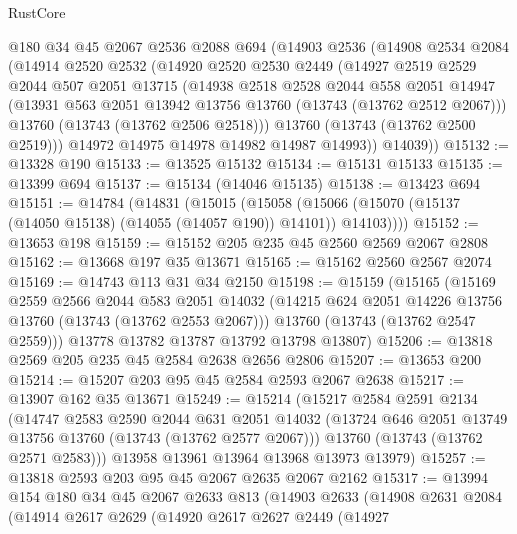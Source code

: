 \begin{lexlean}{RustCore}
\begin{coremodule}
    @180
    @34
    @45
    @2067
    @2536
    @2088
    @694
    (@14903
      @2536
      (@14908
        @2534
        @2084
        (@14914
          @2520
          @2532
          (@14920
            @2520
            @2530
            @2449
            (@14927
              @2519
              @2529
              @2044
              @507
              @2051
              @13715
              (@14938
                @2518
                @2528
                @2044
                @558
                @2051
                @14947
                (@13931 @563 @2051 @13942 @13756 @13760 (@13743 (@13762 @2512 @2067)))
                @13760
                (@13743 (@13762 @2506 @2518)))
              @13760
              (@13743 (@13762 @2500 @2519)))
            @14972
            @14975
            @14978
            @14982
            @14987
            @14993))
        @14039))
@15132 := @13328 @190
@15133 := @13525 @15132
@15134 := @15131 @15133
@15135 := @13399 @694
@15137 := @15134 (@14046 @15135)
@15138 := @13423 @694
@15151 := @14784
    (@14831
      (@15015
        (@15058 (@15066 (@15070 (@15137 (@14050 @15138) (@14055 (@14057 @190)) @14101)) @14103))))
@15152 := @13653 @198
@15159 := @15152 @205 @235 @45 @2560 @2569 @2067 @2808
@15162 := @13668 @197 @35 @13671
@15165 := @15162 @2560 @2567 @2074
@15169 := @14743 @113 @31 @34 @2150
@15198 := @15159
    (@15165
      (@15169
        @2559
        @2566
        @2044
        @583
        @2051
        @14032
        (@14215 @624 @2051 @14226 @13756 @13760 (@13743 (@13762 @2553 @2067)))
        @13760
        (@13743 (@13762 @2547 @2559)))
      @13778
      @13782
      @13787
      @13792
      @13798
      @13807)
@15206 := @13818 @2569 @205 @235 @45 @2584 @2638 @2656 @2806
@15207 := @13653 @200
@15214 := @15207 @203 @95 @45 @2584 @2593 @2067 @2638
@15217 := @13907 @162 @35 @13671
@15249 := @15214
    (@15217
      @2584
      @2591
      @2134
      (@14747
        @2583
        @2590
        @2044
        @631
        @2051
        @14032
        (@13724 @646 @2051 @13749 @13756 @13760 (@13743 (@13762 @2577 @2067)))
        @13760
        (@13743 (@13762 @2571 @2583)))
      @13958
      @13961
      @13964
      @13968
      @13973
      @13979)
@15257 := @13818 @2593 @203 @95 @45 @2067 @2635 @2067 @2162
@15317 := @13994
    @154
    @180
    @34
    @45
    @2067
    @2633
    @813
    (@14903
      @2633
      (@14908
        @2631
        @2084
        (@14914
          @2617
          @2629
          (@14920
            @2617
            @2627
            @2449
            (@14927

\end{coremodule}
\end{lexlean}
